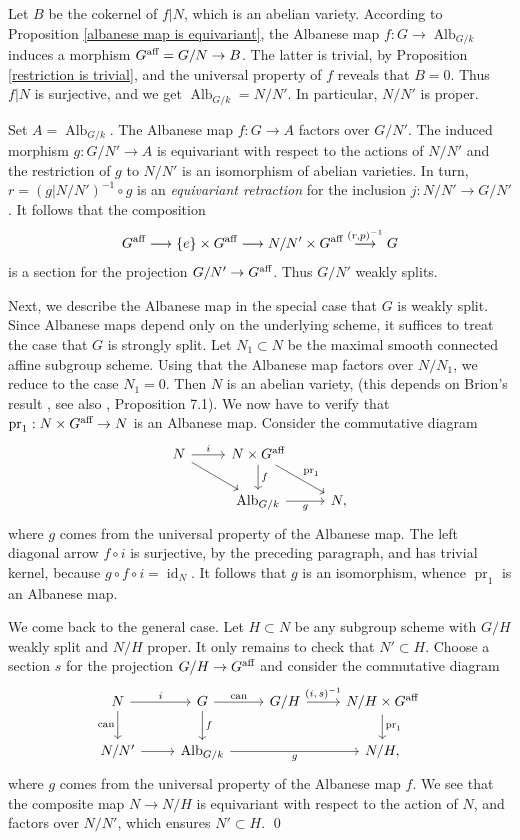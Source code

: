 \documentclass[oneside, 12pt]{amsart}
\theoremstyle{definition}
\theoremstyle{remark}
\newcommand{\aff}{\text{\rm aff}}
\newcommand{\Alb}{\operatorname{Alb}}
\newcommand{\can}{\text{\rm  can}}
\newcommand{\id}{{\operatorname{id}}}
\newcommand{\lra}{\longrightarrow}
\newcommand{\pr}{\operatorname{pr}}
\newcommand{\ra}{\rightarrow}
\begin{document}
\proof
Let $B$ be the cokernel of $f|N$, which is an abelian variety.
According to Proposition \ref{albanese map is equivariant},
the Albanese map $f:G\ra\Alb_{G/k}$ induces a morphism $G^\aff=G/N\ra B$. The latter is trivial, by Proposition \ref{restriction is trivial},
and the universal property of $f$ reveals that $B=0$. Thus $f|N$ is surjective, and we get $\Alb_{G/k}=N/N'$.
In particular, $N/N'$ is proper.

Set $A=\Alb_{G/k}$. The Albanese map $f:G\ra A$    factors over $G/N'$.
The induced morphism $g:G/N'\ra A$ is equivariant with respect to the actions of $N/N'$
and the restriction of $g$ to $N/N'$ is an isomorphism of abelian varieties. In turn, $r=(g|N/N')^{-1}\circ g$ is
an \emph{equivariant  retraction} for the inclusion $j: N/N'\ra G/N'$. It follows
that the composition
$$
G^\aff\lra \{e\}\times G^\aff\lra N/N'\times G^\aff \stackrel{(r,p)^{-1}}{\lra} G
$$
is a section for the projection $G/N'\ra G^\aff$. Thus $G/N'$ weakly splits.
 
Next, we describe the Albanese map in  the special case that $G$ is weakly split. Since Albanese maps depend only on the underlying scheme,
it suffices to treat the case that $G$ is strongly split.  Let $N_1\subset N$ be the maximal smooth connected affine subgroup scheme.
Using that the Albanese map factors over $N/N_1$, we reduce to the case $N_1=0$. Then $N$ is an abelian variety,
(this depends on Brion's result \cite{Brion 2009}, see also  \cite{Laurent; Schroeer 2021}, Proposition 7.1).
We now have to verify that  $\pr_1:N\times G^\aff\ra N$ is an Albanese map. Consider the commutative diagram
$$
\begin{tikzcd} 
N\ar[r,"i"]\ar[dr]	& N\times G^\aff\ar[dr,"\pr_1"]\ar[d,"f"]\\
		& \Alb_{G/k}\ar[r,"g"']			 &   N,
\end{tikzcd}
$$
where $g$ comes from the universal property of the Albanese map. The left diagonal arrow $f\circ i$
is surjective, by the preceding paragraph, and has trivial kernel, because $g\circ f\circ i=\id_N$.
It follows that $g$ is an isomorphism, whence $\pr_1$ is an Albanese map.

We come back to the general case. Let $H\subset N$ be any subgroup scheme with  $G/H$ weakly split and $N/H$ proper.
It only remains to  check   that $N'\subset H$. Choose a section $s$ for the projection $G/H\ra G^\aff$ and consider the commutative diagram
$$
\begin{tikzcd} 
N\ar[r,"i"]\ar[d,"\can"']	& G\ar[r,"\can"]\ar[d,"f"]	& G/H\ar[r,"(\text{$i,s$})^{-1}" ]		& N/H\times G^\aff\ar[d,"\pr_1"]\\
N/N'\ar[r]	& \Alb_{G/k}\ar[rr,"g"']	& 				& N/H,
\end{tikzcd}
$$
where $g$ comes from the universal property of the Albanese map $f$. We see that the composite map $N\ra N/H$ is equivariant with respect to the action of $N$,
and factors over $N/N'$, which ensures $N'\subset H$.
\qed
\end{document}

